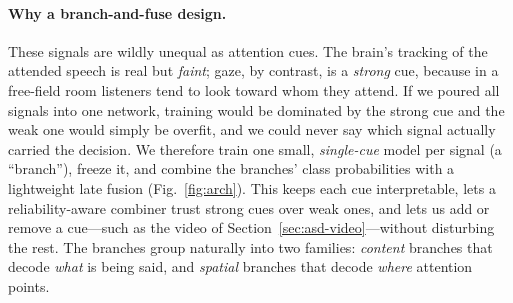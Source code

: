 \documentclass[10pt,twocolumn]{article}
\begin{document}
\paragraph{Why a branch-and-fuse design.}
These signals are wildly unequal as attention cues. The brain's tracking of the
attended speech is real but \emph{faint}; gaze, by contrast, is a \emph{strong}
cue, because in a free-field room listeners tend to look toward whom they attend.
If we poured all signals into one network, training would be dominated by the
strong cue and the weak one would simply be overfit, and we could never say which
signal actually carried the decision. We therefore train one small,
\emph{single-cue} model per signal (a ``branch''), freeze it, and combine the
branches' class probabilities with a lightweight late fusion
(Fig.~\ref{fig:arch}). This keeps each cue interpretable, lets a
reliability-aware combiner trust strong cues over weak ones, and lets us add or
remove a cue---such as the video of Section~\ref{sec:asd-video}---without
disturbing the rest. The branches group naturally into two families:
\emph{content} branches that decode \emph{what} is being said, and \emph{spatial}
branches that decode \emph{where} attention points.
\end{document}
